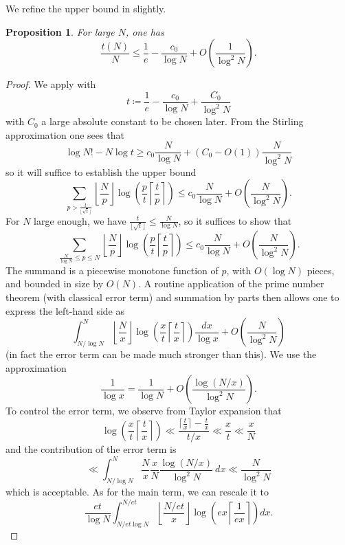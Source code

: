 \documentclass[12pt,a4paper,reqno]{amsart}
\numberwithin{equation}{section}
\theoremstyle{plain}
\newtheorem{proposition}[theorem]{Proposition}
\theoremstyle{definition}
\begin{document}
We refine the upper bound in \cite{tao} slightly.

\begin{proposition}  For large $N$, one has
$$ \frac{t(N)}{N} \leq \frac{1}{e} - \frac{c_0}{\log N} + O\left( \frac{1}{\log^2 N} \right).$$
\end{proposition}

\begin{proof}  We apply  with
  $$ t \coloneqq \frac{1}{e} - \frac{c_0}{\log N} + \frac{C_0}{\log^2 N}$$
with $C_0$ a large absolute constant to be chosen later.  From the Stirling approximation one sees that
$$ \log N! - N \log t \geq c_0 \frac{N}{\log N} + (C_0-O(1)) \frac{N}{\log^2 N}$$
so it will suffice to establish the upper bound
$$ \sum_{p > \frac{t}{\lfloor\sqrt{t}\rfloor}} \left\lfloor \frac{N}{p} \right\rfloor \log \left( \frac{p}{t} \left\lceil \frac{t}{p} \right\rceil \right) \leq c_0 \frac{N}{\log N} + O\left( \frac{N}{\log^2 N} \right).$$
For $N$ large enough, we have $\frac{t}{\lfloor\sqrt{t}\rfloor} \leq \frac{N}{\log N}$, so it suffices to show that
$$ \sum_{\frac{N}{\log N} \leq p \leq N} \left\lfloor \frac{N}{p} \right\rfloor \log \left( \frac{p}{t} \left\lceil \frac{t}{p} \right\rceil \right) \leq c_0 \frac{N}{\log N} + O\left( \frac{N}{\log^2 N} \right).$$
The summand is a piecewise monotone function of $p$, with $O(\log N)$ pieces, and bounded in size by $O(N)$.  A routine application of the prime number theorem (with classical error term) and summation by parts then allows one to express the left-hand side as
$$ \int_{N/\log N}^N \left\lfloor \frac{N}{x} \right\rfloor \log \left( \frac{x}{t} \left\lceil \frac{t}{x} \right\rceil \right) \frac{dx}{\log x} + O\left( \frac{N}{\log^2 N} \right)$$
(in fact the error term can be made much stronger than this). We use the approximation 
$$\frac{1}{\log x} = \frac{1}{\log N} + O\left( \frac{\log (N/x)}{\log^2 N} \right).$$ 
To control the error term, we observe from Taylor expansion that
\begin{equation}\label{tax} 
\log \left( \frac{x}{t} \left\lceil \frac{t}{x} \right\rceil \right)
\ll \frac{\lceil \frac{t}{x} \rceil - \frac{t}{x}}{t/x} \ll \frac{x}{t} \ll \frac{x}{N}
\end{equation}
and the contribution of the error term is
$$ \ll \int_{N/\log N}^N \frac{N}{x} \frac{x}{N} \frac{\log (N/x)}{\log^2 N}\ dx \ll \frac{N}{\log^2 N}$$
which is acceptable.  As for the main term, we can rescale it to
$$ \frac{et}{\log N} \int_{N/et\log N}^{N/et} \left\lfloor \frac{N/et}{x} \right\rfloor \log \left( ex \left\lceil \frac{1}{ex} \right\rceil \right) dx.$$

\end{proof}
\end{document}
